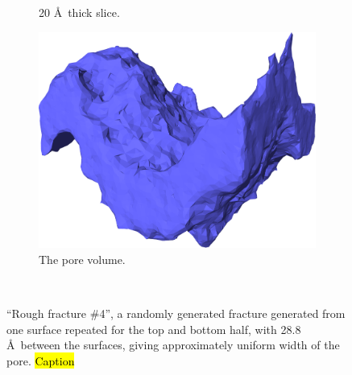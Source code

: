 \begin{figure}[!p]
{\begin{subfigure}[t]{\myfigwidth}
            \caption{20 \AA\ thick slice.}%
        \end{subfigure}%
        \hspace{\myhfillwidth}%
        \begin{subfigure}[t]{\myfigwidth}%
            \centering%
            \includegraphics[width=\textwidth]{images/systems/trimmed-rough_fracture05_09}%
            \caption{The pore volume.}%
        \end{subfigure}%
    }%
    \vspace{10pt}\\%
    \caption{%
        ``Rough fracture \#4'', a randomly generated fracture generated from one surface repeated for the top and bottom half, with 28.8 \AA\ between the surfaces, giving approximately uniform width of the pore. \hl{Caption} %
        \label{fig:renderings_rough_fracture05}%
    }%
\end{figure}%


